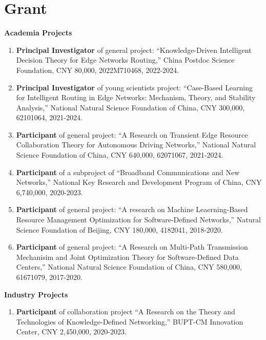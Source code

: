 \documentclass[letterpaper,11pt]{article}
\newcommand{\contentlength}{5.25in} %
\begin{document}
	\section{\textbf{Grant}}
	\begin{tcolorbox}[flush right,breakable,colback=white,colframe=white,width=\contentlength]
		\textbf{Academia Projects}
		\begin{enumerate}
			\item \textbf{Principal Investigator} of general project: “Knowledge-Driven Intelligent Decision Theory for Edge Networks Routing,” China Postdoc Science Foundation, CNY 80,000, 2022M710468, 2022-2024.
			\item \textbf{Principal Investigator} of young scientists project: “Case-Based Learning for Intelligent Routing in Edge Networks: Mechanism, Theory, and Stability Analysis,” National Natural Science Foundation of China, CNY 300,000, 62101064, 2021-2024.
			\item \textbf{Participant} of general project: “A Research on Transient Edge Resource Collaboration Theory for Autonomous Driving Networks,” National Natural Science Foundation of China, CNY 640,000, 62071067, 2021-2024.
			\item \textbf{Participant} of a subproject of “Broadband Communications and New Networks,” National Key Research and Development Program of China, CNY 6,740,000, 2020-2023.
			\item \textbf{Participant} of general project: “A research on Machine Leaerning-Based Resource Management Optimization for Software-Defined Networks,” Natural Science Foundation of Beijing, CNY 180,000, 4182041, 2018-2020.
			\item \textbf{Participant} of general project: “A Research on Multi-Path Transmission Mechanisim and Joint Optimization Theory for Software-Defined Data Centers,” National Natural Science Foundation of China, CNY 580,000, 61671079, 2017-2020.
		\end{enumerate}
		\textbf{Industry Projects}
		\begin{enumerate}
			\item \textbf{Participant} of collaboration project “A Research on the Theory and Technologies of Knowledge-Defined Networking,” BUPT-CM Innovation Center, CNY 2,450,000, 2020-2023.
		\end{enumerate}
	\end{tcolorbox}
	
\end{document}
